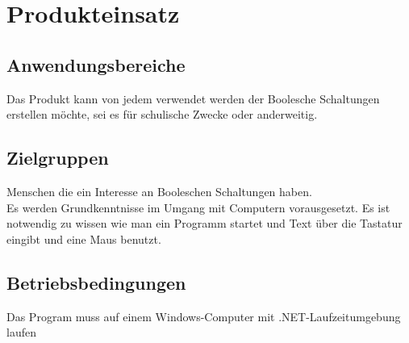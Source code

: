 
\section{Produkteinsatz}


\subsection{Anwendungsbereiche}

Das Produkt kann von jedem verwendet werden der Boolesche Schaltungen erstellen möchte, sei es für schulische Zwecke oder anderweitig.

\subsection{Zielgruppen}

Menschen die ein Interesse an Booleschen Schaltungen haben.\\

Es werden Grundkenntnisse im Umgang mit Computern vorausgesetzt. Es ist notwendig zu wissen wie man ein Programm startet und Text über die Tastatur eingibt und eine Maus benutzt.

\subsection{Betriebsbedingungen}

Das Program muss auf einem Windows-Computer mit .NET-Laufzeitumgebung laufen